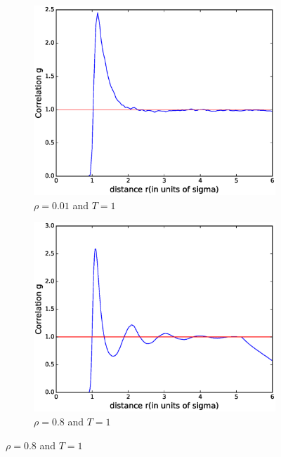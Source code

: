 \documentclass[twoside]{article}
\begin{document}
\begin{figure}[h]
	\begin{subfigure}[b]{0.48\textwidth}
	\centering
	\includegraphics[width=0.9\linewidth]{fig/figure_corr_gas2.eps}
	\caption{$\rho = 0.01$ and $T = 1$}
	\label{fig:figure_corr_gas}
	\end{subfigure}
	\begin{subfigure}[b]{0.48\textwidth}
		\centering
		\includegraphics[width=0.9\linewidth]{fig/figure_corr_gas.eps}
		\caption{$\rho = 0.8$ and $T = 1$}
		\label{fig:figure_corr_liquid}
	\end{subfigure}
	

\end{figure}
\end{document}
